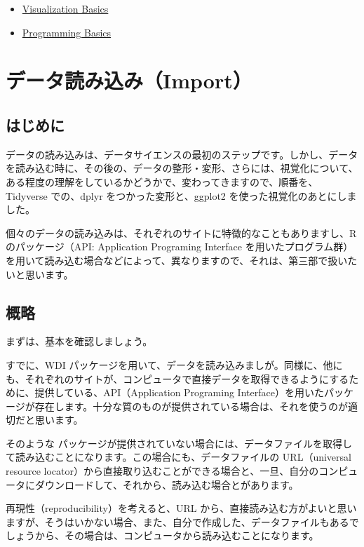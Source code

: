 \documentclass[
  xelatex, ja=standard]{bxjsbook}
\providecommand{\tightlist}{%
  \setlength{\itemsep}{0pt}\setlength{\parskip}{0pt}}
\theoremstyle{definition}
\theoremstyle{definition}
\theoremstyle{definition}
\theoremstyle{definition}
\theoremstyle{remark}
\begin{document}
\begin{itemize}
\tightlist
\item
  \href{https://rstudio.cloud/learn/primers/1.1}{Visualization Basics}
\item
  \href{https://rstudio.cloud/learn/primers/1.2}{Programming Basics}
\end{itemize}

\hypertarget{import}{%
\chapter{データ読み込み（Import）}\label{import}}

\hypertarget{ux306fux3058ux3081ux306b-3}{%
\section{はじめに}\label{ux306fux3058ux3081ux306b-3}}

データの読み込みは、データサイエンスの最初のステップです。しかし、データを読み込む時に、その後の、データの整形・変形、さらには、視覚化について、ある程度の理解をしているかどうかで、変わってきますので、順番を、Tidyverse での、dplyr をつかった変形と、ggplot2 を使った視覚化のあとにしました。

個々のデータの読み込みは、それぞれのサイトに特徴的なこともありますし、R のパッケージ（API: Application Programing Interface を用いたプログラム群）を用いて読み込む場合などによって、異なりますので、それは、第三部で扱いたいと思います。

\hypertarget{ux6982ux7565}{%
\section{概略}\label{ux6982ux7565}}

まずは、基本を確認しましょう。

すでに、WDI パッケージを用いて、データを読み込みましが。同様に、他にも、それぞれのサイトが、コンピュータで直接データを取得できるようにするために、提供している、API（Application Programing Interface）を用いたパッケージが存在します。十分な質のものが提供されている場合は、それを使うのが適切だと思います。

そのような パッケージが提供されていない場合には、データファイルを取得して読み込むことになります。この場合にも、データファイルの URL（universal resource locator）から直接取り込むことができる場合と、一旦、自分のコンピュータにダウンロードして、それから、読み込む場合とがあります。

再現性（reproducibility）を考えると、URL から、直接読み込む方がよいと思いますが、そうはいかない場合、また、自分で作成した、データファイルもあるでしょうから、その場合は、コンピュータから読み込むことになります。
\end{document}
